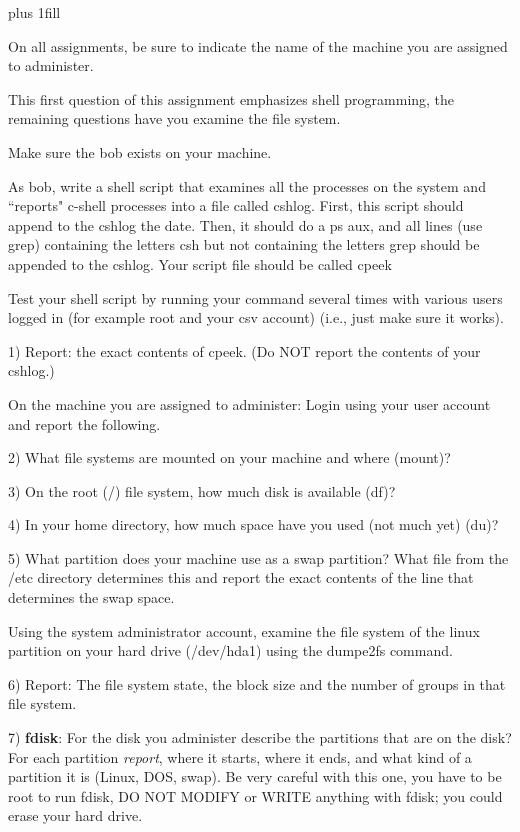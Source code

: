 
\rightskip=0pt plus 1fill

\parindent 0pt

On all assignments, be sure to indicate the name of the
machine you are assigned to administer.

This first question of this assignment emphasizes shell programming,
the remaining questions have you examine the file system.

Make sure the {\ltt{}bob} exists on your 
machine.

As bob, write a shell script that examines all the processes on the
system and ``reports" c-shell processes
into a file called {\ltt{}cshlog}.
First, this script should append to the {\ltt{}cshlog} the {\ltt{}date}.
Then, it should do a {\ltt{}ps aux}, and all lines (use {\ltt{}grep})
containing the letters csh but not containing the letters grep
should be appended to the {\ltt{}cshlog}.
Your script file should be called {\ltt{}cpeek}

Test your shell script by
running your command several times with various users logged 
in (for example root and your csv account)
(i.e., just make sure it works).

1) Report: the exact contents of {\ltt{}cpeek}.
(Do NOT report the contents of your cshlog.)

On the machine you are assigned to administer:
Login using your user account and report the following.

2) What file systems are mounted on your machine and where (mount)?

3) On the root ({\ltt{}/}) file system, how much disk is available (df)?

4) In your home directory, how much space have you used (not much yet) (du)?

5) What partition does your machine use as a swap partition?
What file from the {\ltt{}/etc} directory determines this
and report the exact contents of the line that determines the swap space.

Using the system administrator account,
examine the file system of the linux partition on your hard drive
({\ltt{}/dev/hda1}) using the {\ltt{}dumpe2fs} command.

6) Report: The file system state, the block size and the number of groups
in that file system.

7) {\bf fdisk}:
For the disk you administer describe the partitions that are on the disk?
For each partition {\it report}, where it starts, where it ends, and what kind
of a partition it is (Linux, DOS, swap).
Be very careful with this one, you have to be root to run fdisk,
DO NOT MODIFY or WRITE anything with fdisk; 
you could erase your hard drive.

\bye
